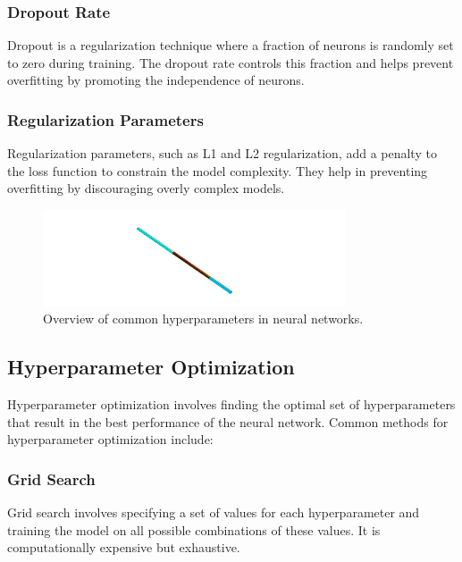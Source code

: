 \documentclass{report}
\begin{document}
        \subsubsection{Dropout Rate}
        
        Dropout is a regularization technique where a fraction of neurons is randomly set to zero during training. The dropout rate controls this fraction and helps prevent overfitting by promoting the independence of neurons.
        
        \subsubsection{Regularization Parameters}
        
        Regularization parameters, such as L1 and L2 regularization, add a penalty to the loss function to constrain the model complexity. They help in preventing overfitting by discouraging overly complex models.
        
        \begin{figure}[h]
            \centering
            \includegraphics[width=0.8\textwidth]{00_Images/00_Velocity.png}
            \caption{Overview of common hyperparameters in neural networks.}
            \label{fig:hyperparameters}
        \end{figure}
        
        \subsection{Hyperparameter Optimization}
        
        Hyperparameter optimization involves finding the optimal set of hyperparameters that result in the best performance of the neural network. Common methods for hyperparameter optimization include:
        
        \subsubsection{Grid Search}
        
        Grid search involves specifying a set of values for each hyperparameter and training the model on all possible combinations of these values. It is computationally expensive but exhaustive.
        
\end{document}

